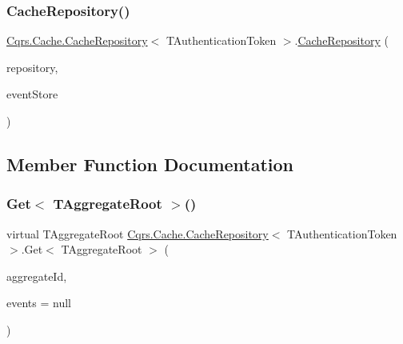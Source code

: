 \subsubsection{\texorpdfstring{Cache\+Repository()}{CacheRepository()}}
{\footnotesize\ttfamily \hyperlink{classCqrs_1_1Cache_1_1CacheRepository}{Cqrs.\+Cache.\+Cache\+Repository}$<$ T\+Authentication\+Token $>$.\hyperlink{classCqrs_1_1Cache_1_1CacheRepository}{Cache\+Repository} (\begin{DoxyParamCaption}\item[{\hyperlink{interfaceCqrs_1_1Domain_1_1IAggregateRepository}{I\+Aggregate\+Repository}$<$ T\+Authentication\+Token $>$}]{repository,  }\item[{\hyperlink{interfaceCqrs_1_1Events_1_1IEventStore}{I\+Event\+Store}$<$ T\+Authentication\+Token $>$}]{event\+Store }\end{DoxyParamCaption})}



\subsection{Member Function Documentation}
\mbox{\label{classCqrs_1_1Cache_1_1CacheRepository_a037acba636aedf23ff376ac0b749ec0c}} 
\subsubsection{\texorpdfstring{Get$<$ T\+Aggregate\+Root $>$()}{Get< TAggregateRoot >()}}
{\footnotesize\ttfamily virtual T\+Aggregate\+Root \hyperlink{classCqrs_1_1Cache_1_1CacheRepository}{Cqrs.\+Cache.\+Cache\+Repository}$<$ T\+Authentication\+Token $>$.Get$<$ T\+Aggregate\+Root $>$ (\begin{DoxyParamCaption}\item[{Guid}]{aggregate\+Id,  }\item[{I\+List$<$ \hyperlink{interfaceCqrs_1_1Events_1_1IEvent}{I\+Event}$<$ T\+Authentication\+Token $>$$>$}]{events = {\ttfamily null} }\end{DoxyParamCaption})\hspace{0.3cm}{\ttfamily [virtual]}}



